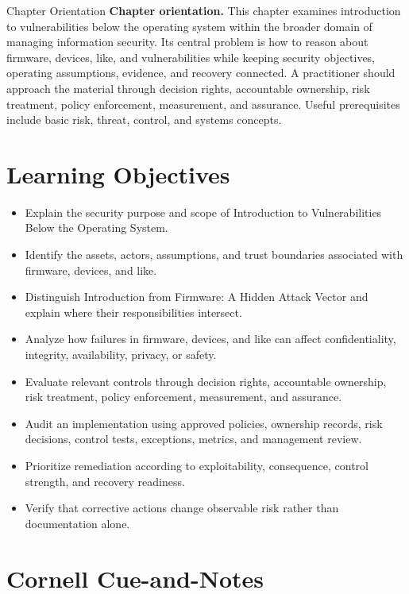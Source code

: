 \documentclass[11pt,letterpaper]{article}
\title{\CornellDocumentTitle}
\author{}
\date{}
\begin{document}
\maketitle
\begin{CornellOverviewBox}{Chapter Orientation}
\textbf{Chapter orientation.} This chapter examines introduction to vulnerabilities below the operating system within the broader domain of managing information security. Its central problem is how to reason about firmware, devices, like, and vulnerabilities while keeping security objectives, operating assumptions, evidence, and recovery connected. A practitioner should approach the material through decision rights, accountable ownership, risk treatment, policy enforcement, measurement, and assurance. Useful prerequisites include basic risk, threat, control, and systems concepts.
\end{CornellOverviewBox}
\section*{Learning Objectives}
\begin{itemize}
\item Explain the security purpose and scope of Introduction to Vulnerabilities Below the Operating System.
\item Identify the assets, actors, assumptions, and trust boundaries associated with firmware, devices, and like.
\item Distinguish Introduction from Firmware: A Hidden Attack Vector and explain where their responsibilities intersect.
\item Analyze how failures in firmware, devices, and like can affect confidentiality, integrity, availability, privacy, or safety.
\item Evaluate relevant controls through decision rights, accountable ownership, risk treatment, policy enforcement, measurement, and assurance.
\item Audit an implementation using approved policies, ownership records, risk decisions, control tests, exceptions, metrics, and management review.
\item Prioritize remediation according to exploitability, consequence, control strength, and recovery readiness.
\item Verify that corrective actions change observable risk rather than documentation alone.
\end{itemize}
\section*{Cornell Cue-and-Notes}
\end{document}

